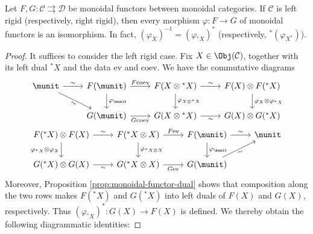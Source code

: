 \begin{proposition}\label{prop:monoidal-functor-rigidity}
	Let $F, G: \mathcal{C} \rightrightarrows \mathcal{D}$ be monoidal functors between monoidal categories. If $\mathcal{C}$ is left rigid (respectively, right rigid), then every morphism $\varphi: F \to G$ of monoidal functors is an isomorphism. In fact, $(\varphi_X)^{-1} = \left(\varphi_{{}^* X}\right)^*$ (respectively, ${}^* \left( \varphi_{X^*} \right)$).
\end{proposition}
\begin{proof}
	It suffices to consider the left rigid case. Fix $X \in \Obj(\mathcal{C})$, together with its left dual ${}^* X$ and the data $\mathrm{ev}$ and $\mathrm{coev}$. We have the commutative diagrams
	\begin{equation*}\begin{gathered}
		\begin{tikzcd}
			\munit \arrow[r, "\sim"] \arrow[rd, "\sim"' sloped] & F(\munit) \arrow[d, "{\varphi_{\munit}}"] \arrow[r, "{F\mathrm{coev}}"] & F(X \otimes {}^* X) \arrow[r, "\sim"] \arrow[d, "{\varphi_{X \otimes {}^* X}}"] & F(X) \otimes F({}^* X) \arrow[d, "{\varphi_X \otimes \varphi_{{}^* X}}"] \\
			& G(\munit) \arrow[r, "{G\mathrm{coev}}"'] & G(X \otimes {}^* X) \arrow[r, "\sim"'] & G(X) \otimes G({}^* X)
		\end{tikzcd} \\
		\begin{tikzcd}
			F({}^* X) \otimes F(X) \arrow[r, "\sim"] \arrow[d, "{\varphi_{{}^* X} \otimes \varphi_X}"'] & F({}^* X \otimes X) \arrow[r, "{F\mathrm{ev}}"] \arrow[d, "{\varphi_{{}^* X \otimes X}}"] & F(\munit) \arrow[r, "\sim"] \arrow[d, "{\varphi_{\munit}}"] & \munit \\
			G({}^* X) \otimes G(X) \arrow[r, "\sim"'] & G({}^* X \otimes X) \arrow[r, "{G\mathrm{ev}}"'] & G(\munit) \arrow[ru, "\sim"' sloped] &
		\end{tikzcd}
	\end{gathered}\end{equation*}
	Moreover, Proposition \ref{prop:monoidal-functor-dual} shows that composition along the two rows makes $F({}^* X)$ and $G({}^* X)$ into left duals of $F(X)$ and $G(X)$, respectively. Thus $(\varphi_{{}^* X})^*: G(X) \to F(X)$ is defined. We thereby obtain the following diagrammatic identities:


\end{proof}
